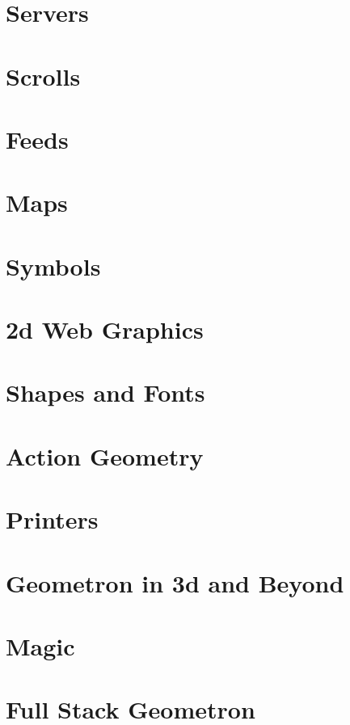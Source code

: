 \documentclass[ebook,12pt,openany]{memoir} %
\begin{document}
\chapter{Servers}

\chapter{Scrolls}

\chapter{Feeds}

\chapter{Maps}

\chapter{Symbols}

\chapter{2d Web Graphics}

\chapter{Shapes and Fonts}

\chapter{Action Geometry}

\chapter{Printers}

\chapter{Geometron in 3d and Beyond}

\chapter{Magic}

\chapter{Full Stack Geometron}



\end{document}
